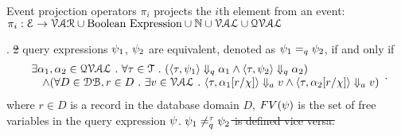 % 
Event projection operators $\pi_i$ projects the $i$th element from an event: 
\\
$\pi_i : 
\mathcal{E} \to \mathcal{VAR}\cup \mbox{Boolean Expression}  \cup \mathbb{N} \cup \mathcal{VAL} \cup \mathcal{QVAL} $ 
\\
%
%
\begin{defn}.
%
\label{def:query_equal}
 \sout{2} query expressions $\psi_1$, $\psi_2$ are equivalent, denoted as $\psi_1 =_{q} \psi_2$, if and only if
$$
 \begin{array}{l} 
  \exists \alpha_1, \alpha_2 \in \mathcal{QVAL} ~.~ \forall \mathtt{\tau} \in \mathcal{T} ~.~
    (\langle \mathtt{\tau},  \psi_1 \rangle \Downarrow_q \alpha_1 \land \langle \mathtt{\tau},  \psi_2  \rangle \Downarrow_q \alpha_2) 
    \\
    \quad \land (\forall D \in \mathcal{DB}, r \in D ~.~ 
    \exists v \in \mathcal{VAL} ~.~ 
          \langle \mathtt{\tau}, \alpha_1[r/\chi] \rangle \Downarrow_a v \land \langle \mathtt{\tau},  \alpha_2[r/\chi]  \rangle \Downarrow_a v)  
  \end{array}.
$$
where $r \in D$ is a record in the database domain $D$, $FV(\psi)$ is the set of free variables in the query expression $\psi$.
\sout{$\psi_1 \neq_{q}^{\mathtt{\tau}} \psi_2$  is defined vice versa.}
%
\end{defn}
